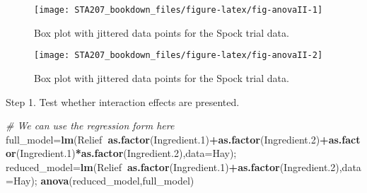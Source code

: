 \documentclass[12pt,]{book}
\newenvironment{Shaded}{\begin{snugshade}}{\end{snugshade}}
\newcommand{\KeywordTok}[1]{\textcolor[rgb]{0.13,0.29,0.53}{\textbf{#1}}}
\newcommand{\DataTypeTok}[1]{\textcolor[rgb]{0.13,0.29,0.53}{#1}}
\newcommand{\DecValTok}[1]{\textcolor[rgb]{0.00,0.00,0.81}{#1}}
\newcommand{\CommentTok}[1]{\textcolor[rgb]{0.56,0.35,0.01}{\textit{#1}}}
\newcommand{\OperatorTok}[1]{\textcolor[rgb]{0.81,0.36,0.00}{\textbf{#1}}}
\newcommand{\NormalTok}[1]{#1}
\begin{document}
\begin{figure}

{\centering \texttt{[image: STA207\_bookdown\_files/figure-latex/fig-anovaII-1]} 

}

\caption{Box plot with jittered data points for the Spock trial data.}\label{fig:fig-anovaII1}
\end{figure}

\begin{Shaded}
\end{Shaded}

\begin{figure}

{\centering \texttt{[image: STA207\_bookdown\_files/figure-latex/fig-anovaII-2]} 

}

\caption{Box plot with jittered data points for the Spock trial data.}\label{fig:fig-anovaII2}
\end{figure}

Step 1. Test whether interaction effects are presented.

\begin{Shaded}
\begin{Highlighting}[]
\CommentTok{# We can use the regression form here}
\NormalTok{full_model=}\KeywordTok{lm}\NormalTok{(Relief}\OperatorTok{~}\KeywordTok{as.factor}\NormalTok{(Ingredient.}\DecValTok{1}\NormalTok{)}\OperatorTok{+}\KeywordTok{as.factor}\NormalTok{(Ingredient.}\DecValTok{2}\NormalTok{)}\OperatorTok{+}\KeywordTok{as.factor}\NormalTok{(Ingredient.}\DecValTok{1}\NormalTok{)}\OperatorTok{*}\KeywordTok{as.factor}\NormalTok{(Ingredient.}\DecValTok{2}\NormalTok{),}\DataTypeTok{data=}\NormalTok{Hay);}
\NormalTok{reduced_model=}\KeywordTok{lm}\NormalTok{(Relief}\OperatorTok{~}\KeywordTok{as.factor}\NormalTok{(Ingredient.}\DecValTok{1}\NormalTok{)}\OperatorTok{+}\KeywordTok{as.factor}\NormalTok{(Ingredient.}\DecValTok{2}\NormalTok{),}\DataTypeTok{data=}\NormalTok{Hay);}
\KeywordTok{anova}\NormalTok{(reduced_model,full_model)}
\end{Highlighting}
\end{Shaded}
\end{document}
